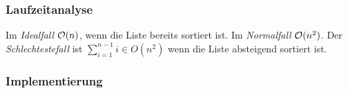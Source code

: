 \documentclass[10pt,a4paper]{article}
\begin{document}
\begin{multicols*}{4}
\subsubsection*{Laufzeitanalyse}
Im \textit{Idealfall} \(\mathcal{O}(n)\), wenn die Liste bereits sortiert ist. Im \textit{Normalfall} \(\mathcal{O}(n^{2})\).
Der \textit{Schlechtestefall} ist \(\sum_{i=1}^{n-1} i \in O(n^{2})\) wenn die Liste absteigend sortiert ist.
\subsubsection*{Implementierung}

\newcommand{\blockindent}{10}
\newcommand{\keyword}[1]{{\bf#1}\;}


\newcommand{\foreachloop}[3]
{
	\keyword{foreach}#1\;\keyword{in}#2\;\keyword{do}
	\addtocounter{indentation}{\blockindent}
	{
		\begin{adjustwidth}{\value{indentation}pt}{}
			#3
		\end{adjustwidth}
	}
	\addtocounter{indentation}{-\blockindent}
}

\newcommand{\forloop}[3]
{
	\keyword{for}#1\;\keyword{to}#2\;\keyword{do}
	\addtocounter{indentation}{\blockindent}
	{
		\begin{adjustwidth}{\value{indentation}pt}{}
			#3
		\end{adjustwidth}
	}
	\addtocounter{indentation}{-\blockindent}
}

\newcommand{\whileloop}[2]
{
	\keyword{while}#1\;\keyword{do}
	\addtocounter{indentation}{\blockindent}
	{
		\begin{adjustwidth}{\value{indentation}pt}{}
			#2
		\end{adjustwidth}
	}
	\addtocounter{indentation}{-\blockindent}
}

\newcommand{\ifstat}[2]
{
	\keyword{if}#1\;\keyword{then}
	\addtocounter{indentation}{\blockindent}
	{
		\begin{adjustwidth}{\value{indentation}pt}{}
			#2
		\end{adjustwidth}
	}
	\addtocounter{indentation}{-\blockindent}
}

\newcommand{\ifelstat}[3]
{
	\keyword{if}#1\;\keyword{then}
	\addtocounter{indentation}{\blockindent}
	{
		\begin{adjustwidth}{\value{indentation}pt}{}
			#2
		\end{adjustwidth}
		\keyword{else}
		\begin{adjustwidth}{\value{indentation}pt}{}
			#3
		\end{adjustwidth}
	}
	\addtocounter{indentation}{-\blockindent}
}


\end{multicols*}
\end{document}
